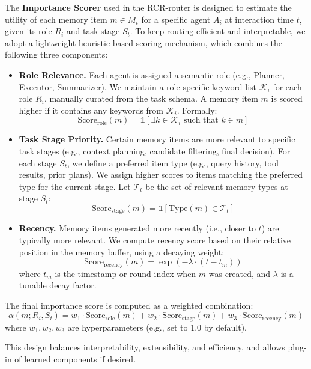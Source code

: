 The \textbf{Importance Scorer} used in the RCR-router is designed to estimate the utility of each memory item $m \in M_t$ for a specific agent $A_i$ at interaction time $t$, given its role $R_i$ and task stage $S_t$. To keep routing efficient and interpretable, we adopt a lightweight heuristic-based scoring mechanism, which combines the following three components:

\begin{itemize}
    \item \textbf{Role Relevance.}  
    Each agent is assigned a semantic role (e.g., Planner, Executor, Summarizer). We maintain a role-specific keyword list $\mathcal{K}_i$ for each role $R_i$, manually curated from the task schema. A memory item $m$ is scored higher if it contains any keywords from $\mathcal{K}_i$. Formally:
    $$
    \text{Score}_{\text{role}}(m) = \mathbb{1}[\exists k \in \mathcal{K}_i \text{ such that } k \in m]
    $$

    \item \textbf{Task Stage Priority.}  
    Certain memory items are more relevant to specific task stages (e.g., context planning, candidate filtering, final decision). For each stage $S_t$, we define a preferred item type (e.g., query history, tool results, prior plans). We assign higher scores to items matching the preferred type for the current stage. Let $\mathcal{T}_t$ be the set of relevant memory types at stage $S_t$:
    $$
    \text{Score}_{\text{stage}}(m) = \mathbb{1}[\text{Type}(m) \in \mathcal{T}_t]
    $$

    \item \textbf{Recency.}  
    Memory items generated more recently (i.e., closer to $t$) are typically more relevant. We compute recency score based on their relative position in the memory buffer, using a decaying weight:
    $$
    \text{Score}_{\text{recency}}(m) = \exp(-\lambda \cdot (t - t_m))
    $$
    where $t_m$ is the timestamp or round index when $m$ was created, and $\lambda$ is a tunable decay factor.
\end{itemize}

The final importance score is computed as a weighted combination:
$$
\alpha(m; R_i, S_t) = w_1 \cdot \text{Score}_{\text{role}}(m) + w_2 \cdot \text{Score}_{\text{stage}}(m) + w_3 \cdot \text{Score}_{\text{recency}}(m)
$$
where $w_1, w_2, w_3$ are hyperparameters (e.g., set to 1.0 by default).

This design balances interpretability, extensibility, and efficiency, and allows plug-in of learned components if desired.

